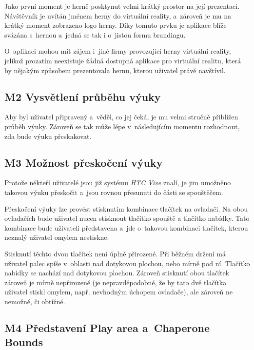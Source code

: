Jako první moment je herně posktynut velmi krátký prostor na její
prezentaci. Návštěvník je uvítán jménem herny do virtuální
reality, a~zároveň je mu na krátký moment zobrazeno logo herny. Díky
tomuto prvku je aplikace blíže svázána s~hernou a~jedná se tak i
o~jistou formu brandingu.

O~aplikaci mohou mít zájem i~jiné firmy provozující
herny virtuální reality, jelikož prozatím neexistuje žádná dostupná
aplikace pro virtuální realitu, která by nějakým způsobem prezentovala
hernu, kterou uživatel právě navštívil.

\subsection{M2 Vysvětlení průběhu
výuky}\label{m2-vysvux11btlenuxed-prux16fbux11bhu-vuxfduky}

Aby byl uživatel připravený a~věděl, co jej čeká, je mu velmi stručně
přiblížen průběh výuky. Zároveň se tak může lépe v~následujícím momentu
rozhodnout, zda bude výuku přeskakovat.

\subsection{M3 Možnost přeskočení
výuky}\label{m3-moux17enost-pux159eskoux10denuxed-vuxfduky}

Protože někteří uživatelé jsou již systému \emph{HTC Vive} znalí, je jim
umožněno takovou výuku přeskočit a~jsou rovnou přesunuti do části se
spouštěčem.

Přeskočení výuky lze provést stisknutím kombinace tlačítek na ovladači.
Na obou ovladačích bude uživatel nucen stisknout tlačítko spouště a
tlačítko nabídky. Tato kombinace bude uživateli představena a~jde
o~takovou kombinaci tlačítek, kterou neznalý uživatel omylem nestiskne.

Stisknutí těchto dvou tlačítek není úplně přirozené. Při běžném držení
má uživatel palec spíše v~oblasti nad dotykovou plochou, nebo mírně pod
ní. Tlačítko nabídky se nachází nad dotykovou plochou. Zároveň stisknutí
obou tlačítek zároveň je mírně nepřirozené (je nepravděpodobné, že by
tato dvě tlačítka uživatel stiskl omylem, např. nevhodným úchopem
ovladače), ale zároveň ne nemožné, či obtížné.

\subsection{M4 Představení Play area a~Chaperone
Bounds}\label{m4-pux159edstavenuxed-play-area-a-chaperone-bounds}

